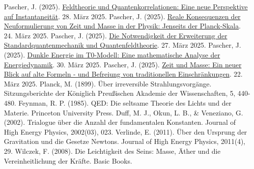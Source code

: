 \documentclass[12pt,a4paper]{article}
\begin{document}
\begin{thebibliography}{99}
		 Pascher, J. (2025). \href{https://github.com/jpascher/T0-Time-Mass-Duality/tree/main/2/pdf/Deutsch/FeldtheorieQuanten.pdf}{Feldtheorie und Quantenkorrelationen: Eine neue Perspektive auf Instantaneität}. 28. März 2025.
		 Pascher, J. (2025). \href{https://github.com/jpascher/T0-Time-Mass-Duality/tree/main/2/pdf/Deutsch/JenseitsPlanck.pdf}{Reale Konsequenzen der Neuformulierung von Zeit und Masse in der Physik: Jenseits der Planck-Skala}. 24. März 2025.
		 Pascher, J. (2025). \href{https://github.com/jpascher/T0-Time-Mass-Duality/tree/main/2/pdf/Deutsch/NotwendigkeitQMErweiterung.pdf}{Die Notwendigkeit der Erweiterung der Standardquantenmechanik und Quantenfeldtheorie}. 27. März 2025.
		 Pascher, J. (2025). \href{https://github.com/jpascher/T0-Time-Mass-Duality/tree/main/2/pdf/Deutsch/MathEnergiedynamik.pdf}{Dunkle Energie im T0-Modell: Eine mathematische Analyse der Energiedynamik}. 30. März 2025.
		 Pascher, J. (2025). \href{https://github.com/jpascher/T0-Time-Mass-Duality/tree/main/2/pdf/Deutsch/ZeitMasseNeuerBlick.pdf}{Zeit und Masse: Ein neuer Blick auf alte Formeln - und Befreiung von traditionellen Einschränkungen}. 22. März 2025.
		 Planck, M. (1899). Über irreversible Strahlungsvorgänge. Sitzungsberichte der Königlich Preußischen Akademie der Wissenschaften, 5, 440-480.
		 Feynman, R. P. (1985). QED: Die seltsame Theorie des Lichts und der Materie. Princeton University Press.
		 Duff, M. J., Okun, L. B., \& Veneziano, G. (2002). Trialogue über die Anzahl der fundamentalen Konstanten. Journal of High Energy Physics, 2002(03), 023.
		 Verlinde, E. (2011). Über den Ursprung der Gravitation und die Gesetze Newtons. Journal of High Energy Physics, 2011(4), 29.
		 Wilczek, F. (2008). Die Leichtigkeit des Seins: Masse, Äther und die Vereinheitlichung der Kräfte. Basic Books.
	\end{thebibliography}
	
\end{document}
